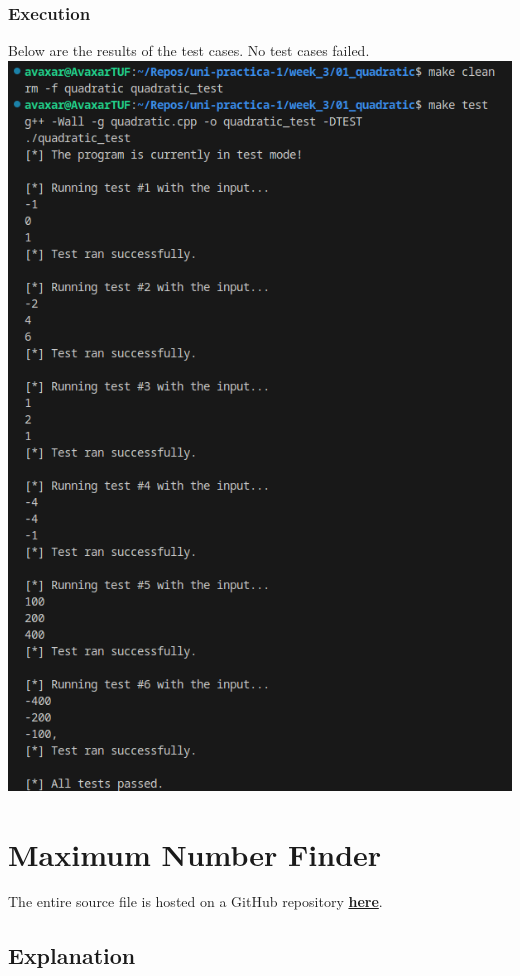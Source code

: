 \documentclass[12pt]{article}
\begin{document}
\subsubsection{Execution}
Below are the results of the test cases. No test cases failed.
\newline\includegraphics[width=\textwidth]{01_quadratic_test}

\pagebreak
\section{Maximum Number Finder}
The entire source file is hosted on a GitHub repository \href{https://github.com/avaxar/uni-practica-1/tree/main/week_3/02_max_number}{\textbf{here}}.

\subsection{Explanation}
\end{document}
